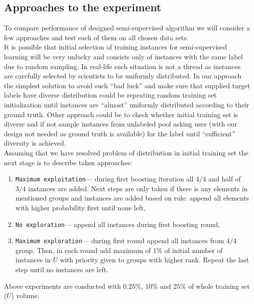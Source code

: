 \documentclass[12pt, a4paper, pdflatex]{report}
\begin{document}
\subsection{Approaches to the experiment\label{sec:experimetnapproach}}
To compare performance of designed semi-supervised algorithm we will consider a few approaches and test each of them on all chosen data sets.\\
It is possible that initial selection of training instances for semi-supervised learning will be very unlucky and consists only of instances with the same label due to random sampling. 
In real-life such situation is not a thread as instances are carefully selected by scientists to be uniformly distributed. 
In our approach the simplest solution to avoid such ``bad luck'' and make sure that supplied target labels have diverse distribution could be repeating random training set initialization until instances are ``almost'' uniformly distributed according to their ground truth. Other approach could be to check whether initial training set is diverse and if not sample instances from unlabeled pool asking user (with our design not needed as ground truth is available) for the label until ``sufficient'' diversity is achieved.\\

Assuming that we have resolved problem of distribution in initial training set the next stage is to describe taken approaches:
\begin{enumerate}
\item \texttt{Maximum exploitation}--- during first boosting iteration all $4/4$ and half of $3/4$ instances are added. Next steps are only taken if there is any elements in mentioned groups and instances are added based on rule: append all elements with higher probability first until none left,
\item \texttt{No exploration}--- append all instances during first boosting round,
\item \texttt{Maximum exploration}--- during first round append all instances from $4/4$ group. Then, in each round add maximum of $1\%$ of initial number of instances in $U$ with priority given to groups with higher rank. Repeat the last step until no instances are left.
\end{enumerate}
Above experiments are conducted with $0.25\%\text{, } 10\% \text{ and } 25\%$ of whole training set ($U$) volume.
\end{document}
